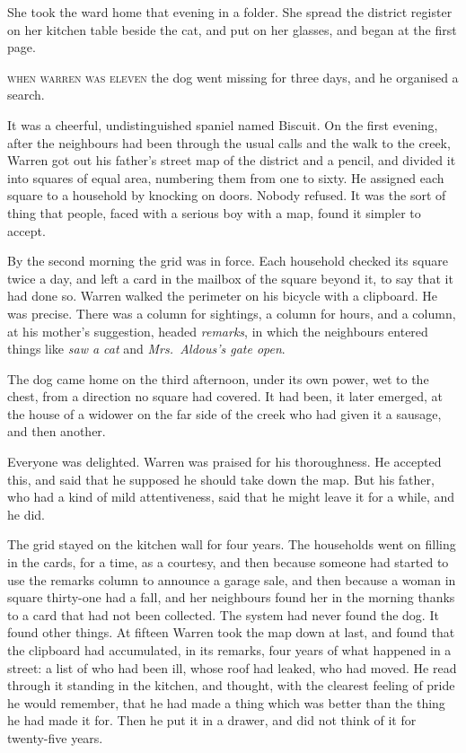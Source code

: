 She took the ward home that evening in a folder. She spread the district register on her kitchen table beside the cat, and put on her glasses, and began at the first page.


\textsc{when warren was eleven} the dog went missing for three days, and he organised a search.

It was a cheerful, undistinguished spaniel named Biscuit. On the first evening, after the neighbours had been through the usual calls and the walk to the creek, Warren got out his father's street map of the district and a pencil, and divided it into squares of equal area, numbering them from one to sixty. He assigned each square to a household by knocking on doors. Nobody refused. It was the sort of thing that people, faced with a serious boy with a map, found it simpler to accept.

By the second morning the grid was in force. Each household checked its square twice a day, and left a card in the mailbox of the square beyond it, to say that it had done so. Warren walked the perimeter on his bicycle with a clipboard. He was precise. There was a column for sightings, a column for hours, and a column, at his mother's suggestion, headed \emph{remarks}, in which the neighbours entered things like \emph{saw a cat} and \emph{Mrs.~Aldous's gate open}.

The dog came home on the third afternoon, under its own power, wet to the chest, from a direction no square had covered. It had been, it later emerged, at the house of a widower on the far side of the creek who had given it a sausage, and then another.

Everyone was delighted. Warren was praised for his thoroughness. He accepted this, and said that he supposed he should take down the map. But his father, who had a kind of mild attentiveness, said that he might leave it for a while, and he did.

The grid stayed on the kitchen wall for four years. The households went on filling in the cards, for a time, as a courtesy, and then because someone had started to use the remarks column to announce a garage sale, and then because a woman in square thirty-one had a fall, and her neighbours found her in the morning thanks to a card that had not been collected. The system had never found the dog. It found other things. At fifteen Warren took the map down at last, and found that the clipboard had accumulated, in its remarks, four years of what happened in a street: a list of who had been ill, whose roof had leaked, who had moved. He read through it standing in the kitchen, and thought, with the clearest feeling of pride he would remember, that he had made a thing which was better than the thing he had made it for. Then he put it in a drawer, and did not think of it for twenty-five years.

